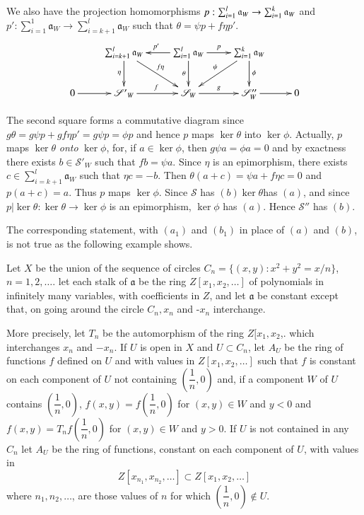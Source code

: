  We also have the projection homomorphisms $p : \sum^{l}_{i=1}
 \mathfrak{a}_W \to \sum^{k}_{i=1}\break \mathfrak{a}_W$ and $p' :
 \sum^1_{i=1} \mathfrak{a}_W \to \sum^{l}_{i=k+1} \mathfrak{a}_W$ such that
 $\theta = \psi p + f \eta p'$.  
\[
\xymatrix{
 & \sum^l_{i=k+1}  \mathfrak{a}_W\ar[d]_{\eta}\ar[dr]^{f\eta}&
\sum^l_{i=1} \mathfrak{a}_W \ar[r]^p\ar[d]_{\theta} \ar[l]_{p'} &
\sum^k_{i=1} \mathfrak{a}_W \ar[d]^{\phi} \ar[dl]_{\psi}\\
0 \ar[r]& \mathscr{S'}_W \ar[r]^f & \mathscr{S}_W \ar[r]^g & \mathscr{S}''_W
\ar[r] & 0
}
\]

The second square forms a commutative diagram since $g \theta = g \psi
p+ g f \eta p' = g \psi p = \phi p$ and hence $p$ maps $\ker \theta$
into $\ker \phi$. Actually, $p$ maps $\ker \theta $ \textit{onto}
$\ker \phi$, for, if $a \in \ker \phi $, then $g \psi a = \phi a =0$
and by exactness there exists $b \in \mathscr{S}'_W$ such that $f b =
\psi a$. Since $\eta $ is an epimorphism, there exists $c \in
\sum^{l}_{i=k+1} \mathfrak{a}_W$ such that $\eta c= -b$. Then $\theta
(a+c)= \psi 
a+f \eta c=0$ and $p(a+c)=a$. Thus $p$ maps $\ker \phi$. Since
$\mathscr{S}$ has $(b) \ker \theta$\pageoriginale has $(a)$, and since $p |\ker
\theta : \ker \theta \to \ker \phi$ is an epimorphism, $\ker \phi $
has $(a)$. Hence $\mathscr{S}''$ has $(b)$. 

The corresponding statement, with $(a_1)$ and $(b_1)$ in place of
$(a)$ and $(b)$, is not true as the following example shows. 

\begin{exam}\label{chap31:exam33}%
Let $X$ be the union of the sequence of circles $C_n = \bigg \{(x,y) :
x^2 + y^2 = x/n\bigg \}$, $n=1,2,\ldots $. let each stalk of
$\mathfrak{a}$ be the ring $Z [x_1, x_2,\ldots]$ of polynomials in
infinitely many variables, with coefficients in $Z$, and let
$\mathfrak{a}$ be constant except that, on going around the circle
$C_n, x_n$ and -$x_n$ interchange.   
\end{exam}

\noindent
More precisely, let $T_n$ be the automorphism of the ring $Z[x_1,
  x_2$,. which interchanges $x_n$ and $-x_n$. If $U$ is open in $X$
  and $U \subset C_n$, let $A_U$ be the ring of functions $f$ defined
  on $U$ and with values in $Z [x_1, x_2, \ldots]$ such that $f$ is
  constant on each component of $U$ not containing
  $\left(\dfrac{1}{n}, 0 \right)$
  and, if a component $W$ of $U$ contains $\left(\dfrac{1}{n},
  0\right)$, $f(x,y) 
  =f\left(\dfrac{1}{n}, 0 \right)$ for $(x,y) \in W$ and $y < 0$ and
  $f(x,y) =T_n 
  f\left(\dfrac{1}{n}, 0 \right)$ for $(x,y) \in W$ and $y > 0$. If $U$ is not
  contained in any $C_n$ let $A_U$ be the ring of functions, constant
  on each component of $U$, with values in 
$$
Z [x_{n_1}, x_{n_2}, \ldots] \subset Z [x_1, x_2, \ldots] 
$$
where $n_1, n_2, \ldots$, are those values of $n$ for which
$\left(\dfrac{1}{n},0 \right) \notin U$. 

